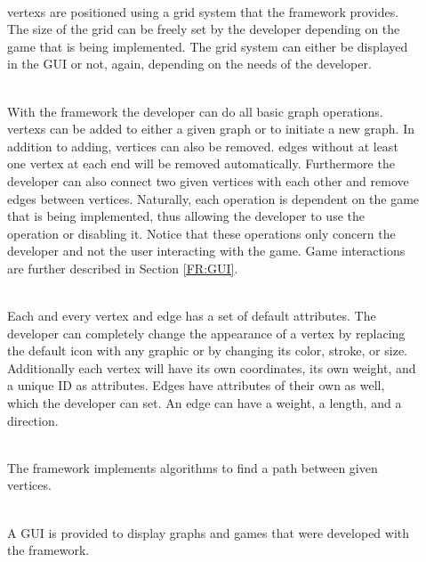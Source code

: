 \begin{description}
\item[] \textbf{} \\
\Glspl{vertex} are positioned using a grid system that the \gls{framework} provides. The size of the grid can be freely set by the \gls{developer} depending on the game that is being implemented. The grid system can either be displayed in the \gls{GUI} or not, again, depending on the needs of the developer.
   \item[] \textbf{} \\
With the framework the developer can do all basic graph operations. \Glspl{vertex} can be added to either a given \gls{graph} or to initiate a new graph. In addition to adding, vertices can also be removed. \Glspl{edge} without at least one vertex at each end will be removed automatically. Furthermore the developer can also connect two given vertices with each other and remove edges between vertices. Naturally, each operation is dependent on the game that is being implemented, thus allowing the developer to use the operation or disabling it. Notice that these operations only concern the developer and not the user interacting with the game. Game interactions are further described in Section \ref{FR:GUI}.
\item[] \textbf{} \\
Each and every vertex and edge has a set of default attributes. The developer can completely change the appearance of a vertex by replacing the default icon with any graphic or by changing its color, stroke, or size. \\
Additionally each vertex will have its own coordinates, its own weight, and a unique \gls{ID} as attributes. Edges have attributes of their own as well, which the developer can set. An edge can have a weight, a length, and a direction.
\item[] \textbf{} \\
The framework implements algorithms to find a \gls{path} between given vertices.
  \item[] \textbf{} \\
  A \gls{GUI} is provided to display graphs and games that were developed with the framework.
\item[] \textbf{} \\

\end{description}
